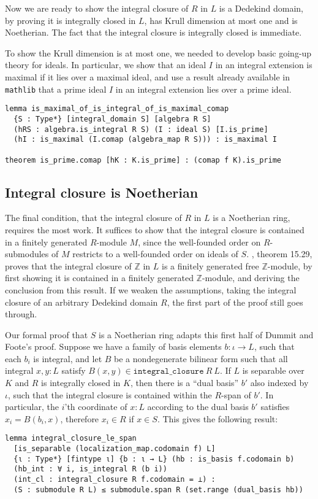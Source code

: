 \documentclass{lipics-v2021}
\newcommand{\lean}[1]{\texttt{#1}\xspace} %
\newcommand{\mathlib}{\texttt{mathlib}\xspace}
\newcommand{\Z}{\mathbb{Z}}
\begin{document}
Now we are ready to show the integral closure of $R$ in $L$ is a Dedekind domain,
by proving it is integrally closed in $L$, has Krull dimension at most one and is Noetherian.
The fact that the integral closure is integrally closed is immediate.

To show the Krull dimension is at most one, we needed to develop basic going-up theory for ideals.
In particular, we show that an ideal $I$ in an integral extension is maximal if it lies over a maximal ideal,
and use a result already available in \mathlib that a prime ideal $I$ in an integral extension lies over a prime ideal.
\begin{lstlisting}
lemma is_maximal_of_is_integral_of_is_maximal_comap
  {S : Type*} [integral_domain S] [algebra R S]
  (hRS : algebra.is_integral R S) (I : ideal S) [I.is_prime]
  (hI : is_maximal (I.comap (algebra_map R S))) : is_maximal I

theorem is_prime.comap [hK : K.is_prime] : (comap f K).is_prime
\end{lstlisting}

\subsection{Integral closure is Noetherian}
The final condition, that the integral closure of $R$ in $L$ is a Noetherian ring, requires the most work.
It suffices to show that the integral closure is contained in a finitely generated $R$-module $M$,
since the well-founded order on $R$-submodules of $M$ restricts to a well-founded order on ideals of $S$.
\cite{Dummit-and-Foote}, theorem 15.29, proves that the integral closure of $\Z$ in $L$ is a finitely generated free $\Z$-module,
by first showing it is contained in a finitely generated $\Z$-module, and deriving the conclusion from this result.
If we weaken the assumptions, taking the integral closure of an arbitrary Dedekind domain $R$,
the first part of the proof still goes through.

Our formal proof that $S$ is a Noetherian ring adapts this first half of Dummit and Foote's proof.
Suppose we have a family of basis elements $b : \iota \to L$, such that each $b_i$ is integral,
and let $B$ be a nondegenerate bilinear form such that all integral $x, y : L$ satisfy $B(x, y) \in \lean{integral\_closure}\ R\ L$.
If $L$ is separable over $K$ and $R$ is integrally closed in $K$,
then there is a ``dual basis'' $b'$ also indexed by $\iota$, such that the integral closure is contained within the $R$-span of $b'$.
In particular, the $i$'th coordinate of $x : L$ according to the dual basis $b'$ satisfies $x_i = B(b_i, x)$,
therefore $x_i \in R$ if $x \in S$.
This gives the following result:
\begin{lstlisting}
lemma integral_closure_le_span
  [is_separable (localization_map.codomain f) L]
  {ι : Type*} [fintype ι] {b : ι → L} (hb : is_basis f.codomain b)
  (hb_int : ∀ i, is_integral R (b i))
  (int_cl : integral_closure R f.codomain = ⊥) :
  (S : submodule R L) ≤ submodule.span R (set.range (dual_basis hb))
\end{lstlisting}
\end{document}
